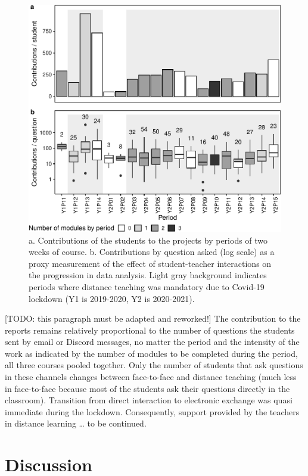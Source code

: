 \documentclass[
]{article}
\begin{document}
\begin{figure}
\centering
\includegraphics{teaching_data_science_files/figure-latex/fig_support_by_time-1.pdf}
\caption{\label{fig:fig_support_by_time} a. Contributions of the
students to the projects by periods of two weeks of course. b.
Contributions by question asked (log scale) as a proxy measurement of
the effect of student-teacher interactions on the progression in data
analysis. Light gray background indicates periods where distance
teaching was mandatory due to Covid-19 lockdown (Y1 is 2019-2020, Y2 is
2020-2021).}
\end{figure}

{[}TODO: this paragraph must be adapted and reworked!{]} The
contribution to the reports remains relatively proportional to the
number of questions the students sent by email or Discord messages, no
matter the period and the intensity of the work as indicated by the
number of modules to be completed during the period, all three courses
pooled together. Only the number of students that ask questions in these
channels changes between face-to-face and distance teaching (much less
in face-to-face because most of the students ask their questions
directly in the classroom). Transition from direct interaction to
electronic exchange was quasi immediate during the lockdown.
Consequently, support provided by the teachers in distance learning
\ldots{} to be continued.

\hypertarget{discussion}{%
\section{Discussion}\label{discussion}}
\end{document}
